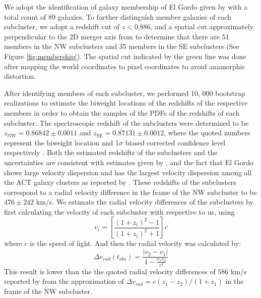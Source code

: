 
We adopt the identification of galaxy membership of El Gordo given by
 with a total count of 89 galaxies.
To further distinguish member galaxies of each subcluster, we adopt a
redshift cut of $z < 0.886$, and a spatial cut approximately perpendicular
to the 2D merger axis from  to determine that
there are 51 members in the NW subclusters and 35 members in the SE subclusters (See Figure
\ref{fig:membership}). 
The spatial cut indicated by the green line was done after
mapping the world coordinates to pixel coordinates to avoid anamorphic distortion. 

After identifying members of each subcluster, we performed 10, 000 bootstrap realizations to estimate the biweight
locations of the redshifts of the respective members in order to obtain the
samples of the PDFs of the redshifts of each subcluster. 
The spectroscopic redshift of the subclusters were
determined to be 
$z_{\mathrm{NW}} = 0.86842 \pm 0.0011$ and 
$z_{\mathrm{SE}} = 0.87131 \pm 0.0012$, where the quoted numbers represent the
biweight location and 1$\sigma$ biased corrected confidence level
respectively \citep{Beers90}.  
Both the estimated redshifts of the subclusters and the uncertainties are
consistent with estimates given by \citealt{Sifon13}, and the fact that El
Gordo shows large velocity dispersion and has the largest velocity
dispersion among all the ACT galaxy clusters as reported by
. These redshifts of the subclusters correspond to a
radial velocity difference in the frame of the NW subcluster
to be $476 \pm 242 $ km/s. We estimate the radial velocity differences of the
subclusters by first calculating the velocity of each subcluster with
respective to us, using  
\begin{equation}
	v_i = \left[ \frac{(1+z_i)^2 - 1 }{(1+z_i)^2 + 1 }\right]c
\end{equation}
where $c$ is the speed of light. And then the radial velocity was calculated
by: 
\begin{equation}
	\Delta v_{rad}(t_{obs}) = \frac{|v_2 - v_1|}{1-\frac{v_1 v_2}{c^2}}
\end{equation}
This result is lower than the the quoted radial velocity differences of
$586$
km/s reported by  from the approximation of $\Delta v_{rad}
= c(z_1 - z_2) / (1 + z_1)$ in the frame of the NW subcluster. 


